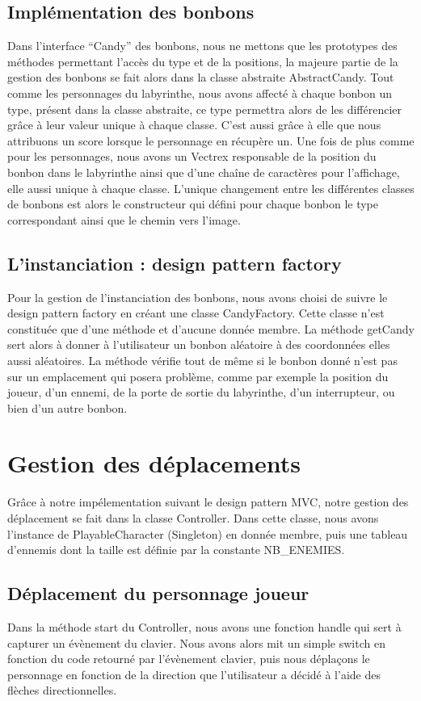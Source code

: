\documentclass [10pt, a4paper]{article}
\begin{document}
\subsection {Implémentation des bonbons}
Dans l'interface ``Candy'' des bonbons, nous ne mettons que les prototypes des méthodes permettant l'accès du type et de la positions, la majeure partie de la gestion des bonbons se fait alors dans la classe abstraite AbstractCandy. Tout comme les personnages du labyrinthe, nous avons affecté à chaque bonbon un type, présent dans la classe abstraite, ce type permettra alors de les différencier grâce à leur valeur unique à chaque classe. C'est aussi grâce à elle que nous attribuons un score lorsque le personnage en récupère un. Une fois de plus comme pour les personnages, nous avons un Vectrex responsable de la position du bonbon dans le labyrinthe ainsi que d'une chaîne de caractères pour l'affichage, elle aussi unique à chaque classe. L'unique changement entre les différentes classes de bonbons est alors le constructeur qui défini pour chaque bonbon le type correspondant ainsi que le chemin vers l'image.

\subsection {L'instanciation : design pattern factory}
Pour la gestion de l'instanciation des bonbons, nous avons choisi de suivre le design pattern factory en créant une classe CandyFactory. Cette classe n'est constituée que d'une méthode et d'aucune donnée membre. La méthode getCandy sert alors à donner à l'utilisateur un bonbon aléatoire à des coordonnées elles aussi aléatoires. La méthode vérifie tout de même si le bonbon donné n'est pas sur un emplacement qui posera problème, comme par exemple la position du joueur, d'un ennemi, de la porte de sortie du labyrinthe, d'un interrupteur, ou bien d'un autre bonbon.



\section {Gestion des déplacements}
Grâce à notre impélementation suivant le design pattern MVC, notre gestion des déplacement se fait dans la classe Controller. Dans cette classe, nous avons l'instance de PlayableCharacter (Singleton) en donnée membre, puis une tableau d'ennemis dont la taille est définie par la constante NB\_ENEMIES.

\subsection {Déplacement du personnage joueur}
Dans la méthode start du Controller, nous avons une fonction handle qui sert à capturer un évènement du clavier. Nous avons alors mit un simple switch en fonction du code retourné par l'évènement clavier, puis nous déplaçons le personnage en fonction de la direction que l'utilisateur a décidé à l'aide des flèches directionnelles.
\end{document}
